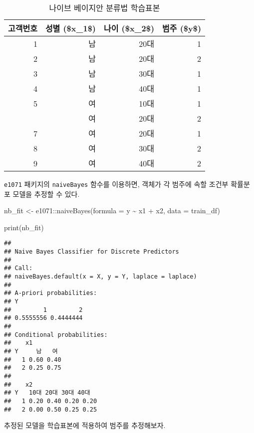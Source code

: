 \documentclass[
]{book}
\newenvironment{Shaded}{\begin{snugshade}}{\end{snugshade}}
\newcommand{\AttributeTok}[1]{\textcolor[rgb]{0.77,0.63,0.00}{#1}}
\newcommand{\FunctionTok}[1]{\textcolor[rgb]{0.00,0.00,0.00}{#1}}
\newcommand{\NormalTok}[1]{#1}
\newcommand{\OtherTok}[1]{\textcolor[rgb]{0.56,0.35,0.01}{#1}}
\newcommand{\SpecialCharTok}[1]{\textcolor[rgb]{0.00,0.00,0.00}{#1}}
\begin{document}
\begin{table}

\caption{\label{tab:naive-bayes-data}나이브 베이지안 분류법 학습표본}
\centering
\begin{tabular}[t]{rrrr}
\toprule
고객번호 & 성별 (\$x\_1\$) & 나이 (\$x\_2\$) & 범주 (\$y\$)\\
\midrule
1 & 남 & 20대 & 1\\
2 & 남 & 20대 & 2\\
3 & 남 & 30대 & 1\\
4 & 남 & 40대 & 1\\
5 & 여 & 10대 & 1\\
\addlinespace
6 & 여 & 20대 & 2\\
7 & 여 & 20대 & 1\\
8 & 여 & 30대 & 2\\
9 & 여 & 40대 & 2\\
\bottomrule
\end{tabular}
\end{table}

\texttt{e1071} 패키지의 \texttt{naiveBayes} 함수를 이용하면, 객체가 각 범주에 속할 조건부 확률분포 모델을 추정할 수 있다.

\begin{Shaded}
\begin{Highlighting}[]
\NormalTok{nb\_fit }\OtherTok{\textless{}{-}}\NormalTok{ e1071}\SpecialCharTok{::}\FunctionTok{naiveBayes}\NormalTok{(}\AttributeTok{formula =}\NormalTok{ y }\SpecialCharTok{\textasciitilde{}}\NormalTok{ x1 }\SpecialCharTok{+}\NormalTok{ x2, }\AttributeTok{data =}\NormalTok{ train\_df)}

\FunctionTok{print}\NormalTok{(nb\_fit)}
\end{Highlighting}
\end{Shaded}

\begin{verbatim}
## 
## Naive Bayes Classifier for Discrete Predictors
## 
## Call:
## naiveBayes.default(x = X, y = Y, laplace = laplace)
## 
## A-priori probabilities:
## Y
##         1         2 
## 0.5555556 0.4444444 
## 
## Conditional probabilities:
##    x1
## Y     남   여
##   1 0.60 0.40
##   2 0.25 0.75
## 
##    x2
## Y   10대 20대 30대 40대
##   1 0.20 0.40 0.20 0.20
##   2 0.00 0.50 0.25 0.25
\end{verbatim}

추정된 모델을 학습표본에 적용하여 범주를 추정해보자.
\end{document}
